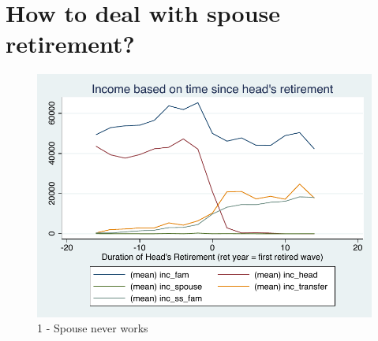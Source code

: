 \documentclass[11pt,onecolumn]{article}
\begin{document}
\section{How to deal with spouse retirement?}


\begin{figure}[h]
	\caption{1 - Spouse never works}
	\centering
	\includegraphics[width=1\textwidth]{../IncomeAroundRetirement/Income_with_spouse_definition_1.pdf}
\end{figure}
\end{document}
